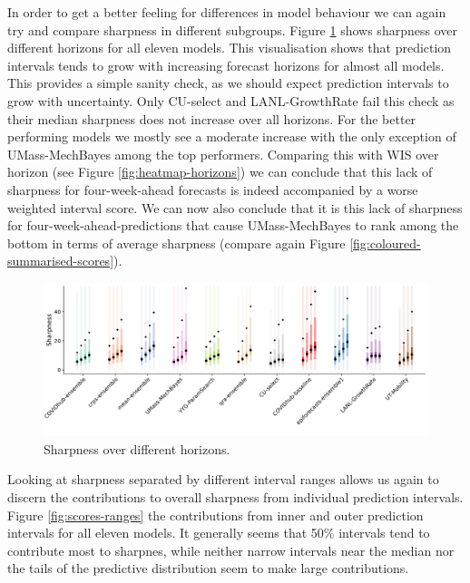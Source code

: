 \documentclass[
]{book}
\begin{document}
In order to get a better feeling for differences in model behaviour we can again try and compare sharpness in different subgroups. Figure \ref{fig:sharpness-horizons} shows sharpness over different horizons for all eleven models. This visualisation shows that prediction intervals tends to grow with increasing forecast horizons for almost all models. This provides a simple sanity check, as we should expect prediction intervals to grow with uncertainty. Only CU-select and LANL-GrowthRate fail this check as their median sharpness does not increase over all horizons. For the better performing models we mostly see a moderate increase with the only exception of UMass-MechBayes among the top performers. Comparing this with WIS over horizon (see Figure \ref{fig:heatmap-horizons}) we can conclude that this lack of sharpness for four-week-ahead forecasts is indeed accompanied by a worse weighted interval score. We can now also conclude that it is this lack of sharpness for four-week-ahead-predictions that cause UMass-MechBayes to rank among the bottom in terms of average sharpness (compare again Figure \ref{fig:coloured-summarised-scores}).

\begin{figure}
\includegraphics[width=1\linewidth]{../visualisation/chapter-5-results/sharpness-horizons} \caption{Sharpness over different horizons. }\label{fig:sharpness-horizons}
\end{figure}

Looking at sharpness separated by different interval ranges allows us again to discern the contributions to overall sharpness from individual prediction intervals. Figure \ref{fig:scores-ranges} the contributions from inner and outer prediction intervals for all eleven models. It generally seems that 50\% intervals tend to contribute most to sharpnes, while neither narrow intervals near the median nor the tails of the predictive distribution seem to make large contributions.
\end{document}
